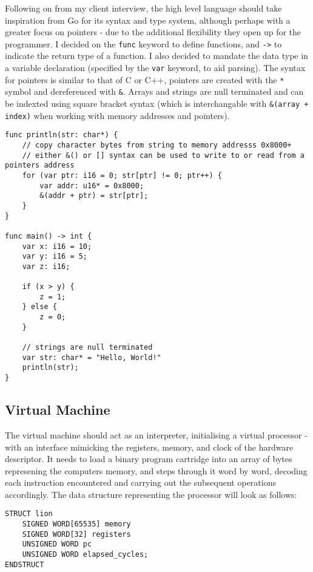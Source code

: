 Following on from my client interview, the high level language should take inspiration from Go for its syntax and type system, although perhaps with a greater focus on pointers - due to the additional flexibility they open up for the programmer. I decided on the \texttt{func} keyword to define functions, and \texttt{->} to indicate the return type of a function. I also decided to mandate the data type in a variable declaration (specified by the \texttt{var} keyword, to aid parsing). The syntax for pointers is similar to that of C or C++, pointers are created with the \texttt{*} symbol and dereferenced with \texttt{\&}. Arrays and strings are null terminated and can be indexted using square bracket syntax (which is interchangable with \texttt{\&(array + index)} when working with memory addresses and pointers).

\begin{lstlisting}
func println(str: char*) {
    // copy character bytes from string to memory addresss 0x8000+ 
    // either &() or [] syntax can be used to write to or read from a pointers address
    for (var ptr: i16 = 0; str[ptr] != 0; ptr++) {
        var addr: u16* = 0x8000; 
        &(addr + ptr) = str[ptr];
    }
}

func main() -> int {
    var x: i16 = 10;
    var y: i16 = 5;
    var z: i16;

    if (x > y) {
        z = 1;
    } else {
        z = 0;
    }

    // strings are null terminated
    var str: char* = "Hello, World!"
    println(str);
}
\end{lstlisting}

\subsection{Virtual Machine}
The virtual machine should act as an interpreter, initialising a virtual processor - with an interface mimicking the registers, memory, and clock of the hardware descriptor. It needs to load a binary program cartridge into an array of bytes represening the computers memory, and steps through it word by word, decoding each instruction encountered and carrying out the subsequent operations accordingly. The data structure representing the processor will look as follows:

\begin{lstlisting}
STRUCT lion
    SIGNED WORD[65535] memory
    SIGNED WORD[32] registers
    UNSIGNED WORD pc
    UNSIGNED WORD elapsed_cycles;
ENDSTRUCT
\end{lstlisting}

